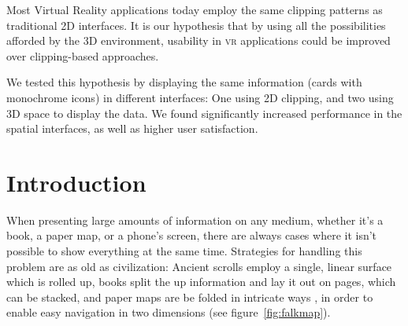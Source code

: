 \documentclass[nobib]{tufte-book} %
\begin{document}
Most Virtual Reality applications today employ the same clipping patterns as traditional 2D interfaces. It is our hypothesis that by using all the possibilities afforded by the 3D environment, usability in \textsc{vr} applications could be improved over clipping-based approaches.

We tested this hypothesis by displaying the same information (cards with monochrome icons) in different interfaces: One using 2D clipping, and two using 3D space to display the data. We found significantly increased performance in the spatial interfaces, as well as higher user satisfaction.




\chapter{Introduction} %

When presenting large amounts of information on any medium, whether it's a book, a paper map, or a phone's screen, there are always cases where it isn't possible to show everything at the same time. Strategies for handling this problem are as old as civilization: Ancient scrolls employ a single, linear surface which is rolled up, books split the up information and lay it out on pages, which can be stacked, and paper maps are be folded in intricate ways \cite{angsusser2012map}, in order to enable easy navigation in two dimensions (see figure~\ref{fig:falkmap}).
\end{document}
